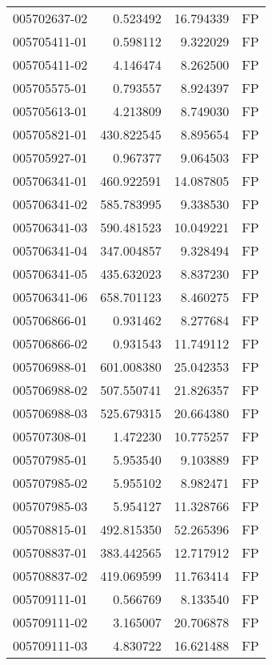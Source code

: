 \begin{tabular}{lrrl}
005702637-02 &    0.523492 &      16.794339 &   FP \\
005705411-01 &    0.598112 &       9.322029 &   FP \\
005705411-02 &    4.146474 &       8.262500 &   FP \\
005705575-01 &    0.793557 &       8.924397 &   FP \\
005705613-01 &    4.213809 &       8.749030 &   FP \\
005705821-01 &  430.822545 &       8.895654 &   FP \\
005705927-01 &    0.967377 &       9.064503 &   FP \\
005706341-01 &  460.922591 &      14.087805 &   FP \\
005706341-02 &  585.783995 &       9.338530 &   FP \\
005706341-03 &  590.481523 &      10.049221 &   FP \\
005706341-04 &  347.004857 &       9.328494 &   FP \\
005706341-05 &  435.632023 &       8.837230 &   FP \\
005706341-06 &  658.701123 &       8.460275 &   FP \\
005706866-01 &    0.931462 &       8.277684 &   FP \\
005706866-02 &    0.931543 &      11.749112 &   FP \\
005706988-01 &  601.008380 &      25.042353 &   FP \\
005706988-02 &  507.550741 &      21.826357 &   FP \\
005706988-03 &  525.679315 &      20.664380 &   FP \\
005707308-01 &    1.472230 &      10.775257 &   FP \\
005707985-01 &    5.953540 &       9.103889 &   FP \\
005707985-02 &    5.955102 &       8.982471 &   FP \\
005707985-03 &    5.954127 &      11.328766 &   FP \\
005708815-01 &  492.815350 &      52.265396 &   FP \\
005708837-01 &  383.442565 &      12.717912 &   FP \\
005708837-02 &  419.069599 &      11.763414 &   FP \\
005709111-01 &    0.566769 &       8.133540 &   FP \\
005709111-02 &    3.165007 &      20.706878 &   FP \\
005709111-03 &    4.830722 &      16.621488 &   FP \\

\end{tabular}
